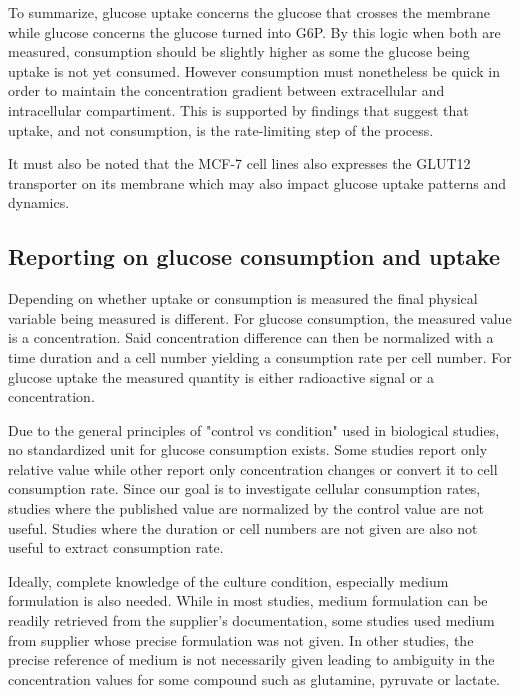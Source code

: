 \documentclass[11pt,a4paper]{article}
\begin{document}
To summarize, glucose uptake concerns the glucose that crosses the membrane while glucose concerns the glucose turned into G6P. By this logic when both are measured, consumption should be slightly higher as some the glucose being uptake is not yet consumed. However consumption must nonetheless be quick in order to maintain the concentration gradient between extracellular and intracellular compartiment. This is supported by findings that suggest that uptake, and not consumption, is the rate-limiting step of the process.\cite{Waki1998}\cite{Burgman2001}

It must also be noted that the MCF-7 cell lines also expresses the GLUT12 transporter on its membrane which may also impact glucose uptake patterns and dynamics. \cite{Burgos2024}


\subsection{Reporting on glucose consumption and uptake}
Depending on whether uptake or consumption is measured the final physical variable being measured is different. For glucose consumption, the measured value is a concentration. Said concentration difference can then be normalized with a time duration and a cell number yielding a consumption rate per cell number. For glucose uptake the measured quantity is either radioactive signal or a concentration.

Due to the general principles of "control vs condition" used in biological studies, no standardized unit for glucose consumption exists. Some studies report only relative value while other report only concentration changes or convert it to cell consumption rate. Since our goal is to investigate cellular consumption rates, studies where the published value are normalized by the control value are not useful. Studies where the duration or cell numbers are not given are also not useful to extract consumption rate.

Ideally, complete knowledge of the culture condition, especially medium formulation is also needed. While in most studies, medium formulation can be readily retrieved from the supplier's documentation, some studies used medium from supplier whose precise formulation was not given. In other studies, the precise reference of medium is not necessarily given leading to ambiguity in the concentration values for some compound such as glutamine, pyruvate or lactate.
\end{document}
